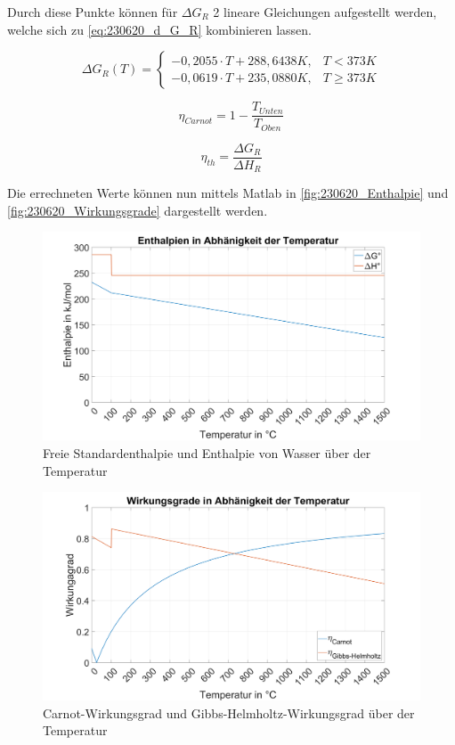 Durch diese Punkte können für $\Delta G_R$ 2 lineare Gleichungen aufgestellt werden, welche sich zu \autoref{eq:230620_d_G_R} kombinieren lassen.

\begin{equation}
    \Delta G_R(T) =
    \begin{cases}
        -0,2055 \cdot T + 288,6438 K, & T < 373 K \\
        -0,0619 \cdot T + 235,0880 K, & T \geq 373 K
    \end{cases}
    \label{eq:230620_d_G_R}
\end{equation}

\begin{equation}
    \eta_{Carnot} = 1 - \frac{T_{Unten}}{T_{Oben}}
    \label{eq:230620_Carnot}
\end{equation}

\begin{equation}
    \eta_{th} = \frac{\Delta G_R}{\Delta H_R}
    \label{eq:230620_Gibbs-Helmholtz}
\end{equation}

Die errechneten Werte können nun mittels Matlab in \autoref{fig:230620_Enthalpie} und \autoref{fig:230620_Wirkungsgrade} dargestellt werden.

\begin{figure}[H]
    \centering
    \includegraphics[width=\textwidth]{Abbildungen/Enthalpien.png}
    \caption{Freie Standardenthalpie und Enthalpie von Wasser über der Temperatur}
    \label{fig:230620_Enthalpie}
\end{figure}

\begin{figure}[H]
    \centering
    \includegraphics[width=\textwidth]{Abbildungen/Wirkungsgrade.png}
    \caption{Carnot-Wirkungsgrad und Gibbs-Helmholtz-Wirkungsgrad über der Temperatur}
    \label{fig:230620_Wirkungsgrade}
\end{figure}
\newpage
